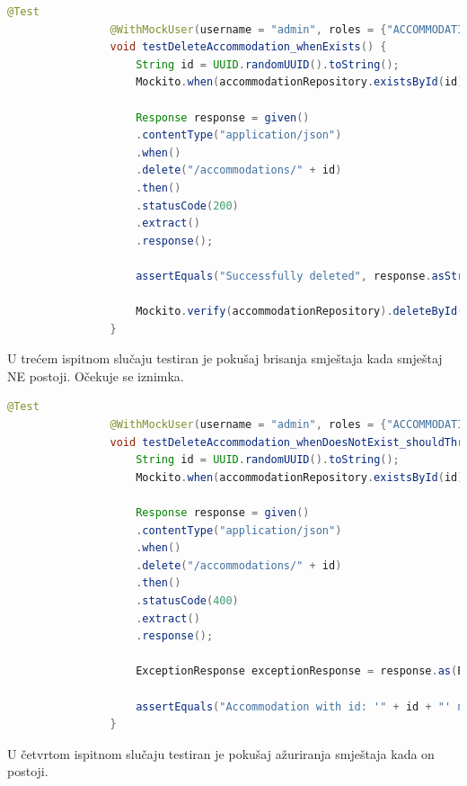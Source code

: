 			\begin{lstlisting}[language=Java]
				@Test
				@WithMockUser(username = "admin", roles = {"ACCOMMODATION", "TRANSPORT", "PATIENT"})
				void testDeleteAccommodation_whenExists() {
					String id = UUID.randomUUID().toString();
					Mockito.when(accommodationRepository.existsById(id)).thenReturn(true);
					
					Response response = given()
					.contentType("application/json")
					.when()
					.delete("/accommodations/" + id)
					.then()
					.statusCode(200)
					.extract()
					.response();
					
					assertEquals("Successfully deleted", response.asString());
					
					Mockito.verify(accommodationRepository).deleteById(id);
				}
			\end{lstlisting}
			
			U trećem ispitnom slučaju testiran je pokušaj brisanja smještaja kada smještaj NE postoji. Očekuje se iznimka.
			
			\begin{lstlisting}[language=Java]
				@Test
				@WithMockUser(username = "admin", roles = {"ACCOMMODATION", "TRANSPORT", "PATIENT"})
				void testDeleteAccommodation_whenDoesNotExist_shouldThrow() {
					String id = UUID.randomUUID().toString();
					Mockito.when(accommodationRepository.existsById(id)).thenReturn(false);
					
					Response response = given()
					.contentType("application/json")
					.when()
					.delete("/accommodations/" + id)
					.then()
					.statusCode(400)
					.extract()
					.response();
					
					ExceptionResponse exceptionResponse = response.as(ExceptionResponse.class);
					
					assertEquals("Accommodation with id: '" + id + "' not found!", exceptionResponse.getMessage());
				}
			\end{lstlisting}
			
			U četvrtom ispitnom slučaju testiran je pokušaj ažuriranja smještaja kada on postoji.
			
